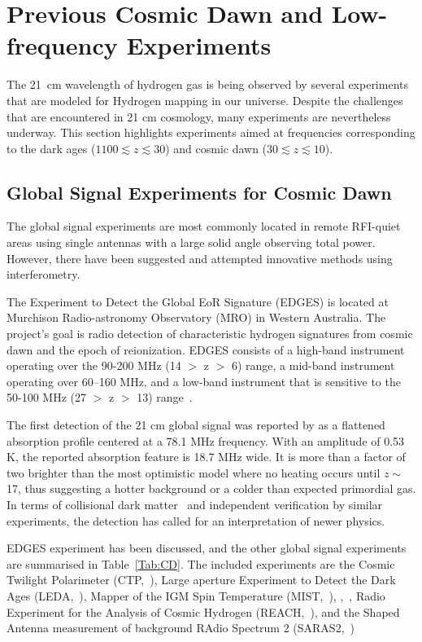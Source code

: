 \section{Previous Cosmic Dawn and Low-frequency Experiments}

The \SI{21}{cm} wavelength of hydrogen gas is being observed by several experiments that are modeled for Hydrogen mapping in our universe. Despite the challenges that are encountered in 21 cm cosmology, many experiments are nevertheless underway. This section highlights experiments aimed at frequencies corresponding to the dark ages ($1100 \lesssim z \lesssim 30$) and cosmic dawn ($30 \lesssim z \lesssim 10$).

\subsection{Global Signal Experiments for Cosmic Dawn}

The global signal experiments are most commonly located in remote RFI-quiet areas using single antennas with a large solid angle observing total power. However, there have been suggested and attempted innovative methods using interferometry. 

The Experiment to Detect the Global EoR Signature (EDGES) is located at Murchison Radio-astronomy Observatory (MRO) in Western Australia. The project's goal is radio detection of characteristic hydrogen signatures from cosmic dawn and the epoch of reionization. EDGES consists of a high-band instrument operating over the 90-200 MHz (14 $>$ z $>$ 6) range, a mid-band instrument operating over 60–160 MHz, and a low-band instrument that is sensitive to the 50-100 MHz (27 $>$ z $>$ 13) range~\citep{2017ApJ...835...49M}. 

The first detection of the 21 cm global signal was reported by \citet{2018Natur.555...67B} as a flattened absorption profile centered at a 78.1 MHz frequency. With an amplitude of 0.53 K, the reported absorption feature is 18.7 MHz wide. It is more than a factor of two brighter than the most optimistic model where no heating occurs until $z \sim$ 17, thus suggesting a hotter background or a colder than expected primordial gas. In terms of collisional dark matter~\citet{2018Natur.555...71B, PhysRevD.98.103005} and independent verification by similar experiments, the detection has called for an interpretation of newer physics.

EDGES experiment has been discussed, and the other global signal experiments are summarised in Table~\ref{Tab:CD}. The included experiments are the Cosmic Twilight Polarimeter (CTP,~\citet{2019ApJ...883..126N}),  Large aperture Experiment to Detect the Dark Ages (LEDA,~\citet{2012JAI.....150004T, 2018MNRAS.478.4193P}), Mapper of the IGM Spin Temperature (MIST,~\citet{inproceedings}),   \prizm,~\citet{2019JAI.....850004P}, Radio Experiment for the Analysis of Cosmic Hydrogen (REACH,~\citet{8879199}), and the Shaped Antenna measurement of background RAdio Spectrum 2 (SARAS2,~\citet{2013ExA....36..319P})  

